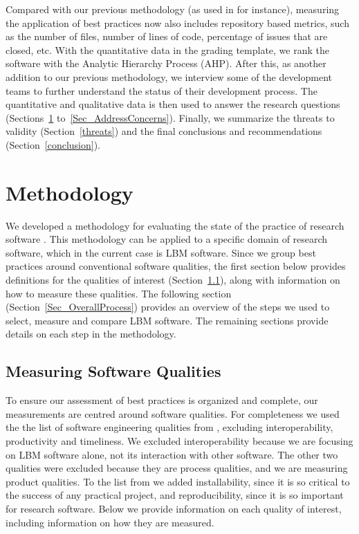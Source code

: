 \documentclass[final, 3p, times, authoryear]{elsarticle}
\begin{document}
Compared with our previous methodology (as used in \citep{SmithEtAl2016} for
instance), measuring the application of best practices now also includes
repository based metrics, such as the number of files, number of lines of code,
percentage of issues that are closed, etc.  With the quantitative data in the
grading template, we rank the software with the Analytic Hierarchy Process
(AHP). After this, as another addition to our previous methodology, we interview
some of the development teams to further understand the status of their
development process. The quantitative and qualitative data is then used to
answer the research questions (Sections~\ref{methodology}
to~\ref{Sec_AddressConcerns}).  Finally, we summarize the threats to validity
(Section~\ref{threats}) and the final conclusions and recommendations
(Section~\ref{conclusion}).

\section{Methodology} \label{methodology}

We developed a methodology for evaluating the state of the practice of research
software \citep{SmithEtAl2021, SmithAndMichalski2022}. This methodology can be
applied to a specific domain of research software, which in the current case is
LBM software.  Since we group best practices around conventional software
qualities, the first section below provides definitions for the qualities of
interest (Section~\ref{softwarequalities}), along with information on how to
measure these qualities. The following section (Section~\ref{Sec_OverallProcess})
provides an overview of the steps we used to select, measure and compare LBM
software.  The remaining sections provide details on each step in the
methodology. 

\subsection{Measuring Software Qualities} \label{softwarequalities}

To ensure our assessment of best practices is organized and complete, our
measurements are centred around software qualities.  For completeness we used
the the list of software engineering qualities from \citet[p.\
17--33]{GhezziEtAl2003}, excluding interoperability, productivity and
timeliness.  We excluded interoperability because we are focusing on LBM
software alone, not its interaction with other software.  The other two
qualities were excluded because they are process qualities, and we are measuring
product qualities.  To the list from \citet{GhezziEtAl2003} we added
installability, since it is so critical to the success of any practical project,
and reproducibility, since it is so important for research software. Below we
provide information on each quality of interest, including information on how
they are measured.
\end{document}
